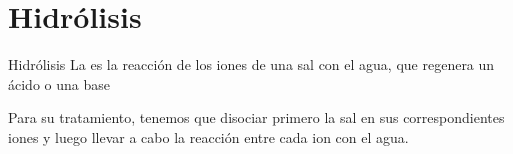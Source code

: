 %
%
%
%
%
%


\section{Hidrólisis}\label{sec:hidrolisis}

\begin{center}
    \begin{definicion}[width=0.9\textwidth]{Hidrólisis}
        La  es la reacción de los iones de una sal con el agua, que regenera un ácido o una base
    \end{definicion}
\end{center}


Para su tratamiento, tenemos que disociar primero la sal en sus correspondientes iones y luego llevar a cabo la reacción entre cada ion con el agua.

